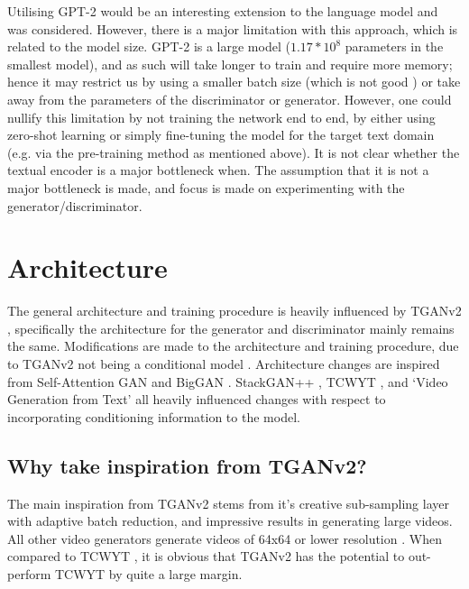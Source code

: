 \documentclass{report}
\theoremstyle{plain}
\theoremstyle{definition}
\theoremstyle{remark}
\numberwithin{equation}{section}
\numberwithin{figure}{section}
\newcommand{\<}{\langle}
\renewcommand{\>}{\rangle}
\begin{document}
Utilising GPT-2 \cite{radford_language_2019} would be an interesting extension to the language model and was considered. However, there is a major limitation with this approach, which is related to the model size. GPT-2 is a large model ($1.17*10^8$ parameters in the smallest model), and as such will take longer to train and require more memory; hence it may restrict us by using a smaller batch size (which is not good \cite{brock_large_2018}) or take away from the parameters of the discriminator or generator. However, one could nullify this limitation by not training the network end to end, by either using zero-shot learning or simply fine-tuning the model for the target text domain (e.g. via the pre-training method as mentioned above). It is not clear whether the textual encoder is a major bottleneck when. The assumption that it is not a major bottleneck is made, and focus is made on experimenting with the generator/discriminator.

\section{Architecture}

The general architecture and training procedure is heavily influenced by TGANv2 \cite{saito_tganv2:_2018}, specifically the architecture for the generator and discriminator mainly remains the same. Modifications are made to the architecture and training procedure, due to TGANv2 not being a conditional model \cite{saito_tganv2:_2018}. Architecture changes are inspired from Self-Attention GAN \cite{zhang_self-attention_2018} and BigGAN \cite{brock_large_2018}. StackGAN++ \cite{zhang_stackgan++:_2017}, TCWYT \cite{pan_create_2018}, and `Video Generation from Text' \cite{li_video_2017} all heavily influenced changes with respect to incorporating conditioning information to the model.

\subsection{Why take inspiration from TGANv2?}

The main inspiration from TGANv2 \cite{saito_tganv2:_2018} stems from it's creative sub-sampling layer with adaptive batch reduction, and impressive results in generating large videos. All other video generators generate videos of 64x64 or lower resolution \cite{pan_create_2018,li_video_2017}. When compared to TCWYT \cite{pan_create_2018}, it is obvious that TGANv2 \cite{saito_tganv2:_2018} has the potential to out-perform TCWYT \cite{pan_create_2018} by quite a large margin.
\end{document}
